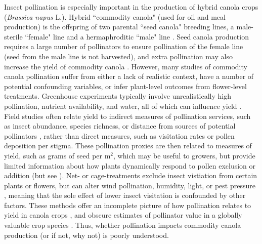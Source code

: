 \documentclass[12pt, draft]{article} %
\begin{document}
Insect pollination is especially important in the production of hybrid canola crops (\textit{Brassica napus} L.).
Hybrid ``commodity canola" (used for oil and meal production) is the offspring of two parental ``seed canola" breeding lines, a male-sterile ``female" line and a hermaphroditic  ``male" line \citep{westcott2001,steffan2003,clay2009}. 
Seed canola production requires a large number of pollinators to ensure pollination of the female line (seed from the male line is not harvested), and extra pollination may also increase the yield of commodity canola \citep{morandin2005,rader_phd,bommarco2012,bartomeus2015,perrot2018}. 
However, many studies of commodity canola pollination suffer from either a lack of realistic context, have a number of potential confounding variables, or infer plant-level outcomes from flower-level treatments. 
Greenhouse experiments typically involve unrealistically high pollination, nutrient availability, and water, all of which can influence yield \citep{bartomeus2015,marini2015}.
Field studies often relate yield to indirect measures of pollination services, such as insect abundance, species richness, or distance from sources of potential pollinators \citep{morandin2005,ricketts2008}, rather than direct measures, such as visitation rates or pollen deposition per stigma.
These pollination proxies are then related to measures of yield, such as grams of seed per m$^2$, which may be useful to growers, but provide limited information about how plants dynamically respond to pollen exclusion or addition (but see \citealp{sabbahi2005}).
Net- or cage-treatments exclude insect vistiation from certain plants or flowers, but can alter wind pollination, humidity, light, or pest pressure \citep{olsson1960, neal2004, jauker2008}, meaning that the sole effect of lower insect visitation is confounded by other factors.
These methods offer an incomplete picture of how pollination relates to yield in canola crops \citep{ouvrard2019}, and obscure estimates of pollinator value in a globally valuable crop species \citep{melathopoulos2015}. 
Thus, whether pollination impacts commodity canola production (or if not, why not) is poorly understood.
\end{document}
